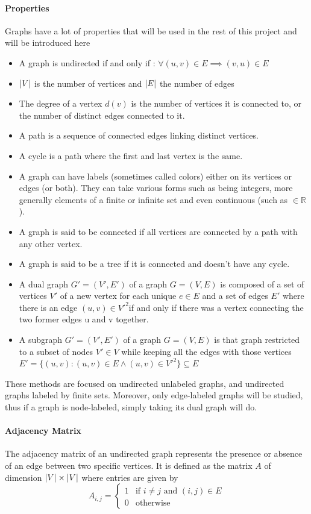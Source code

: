 \documentclass{article}
\DeclarePairedDelimiter{\abs}{\lvert}{\rvert}
\newcommand*{\R}{%
  \mathbb{R}%
}
\theoremstyle{definition}
\begin{document}
\paragraph{Properties} Graphs have a lot of properties that will be used in the rest of this project and will be introduced here
\begin{itemize}
	\item A graph is undirected if and only if : $\forall (u,v) \in E \implies (v,u)\in E$
	\item $\abs{V}$ is the number of vertices and $\abs{E}$ the number of edges
	\item The degree of a vertex $d(v)$ is the number of vertices it is connected to, or the number of distinct edges connected to it.
	\item A path is a sequence of connected edges linking distinct vertices.
	\item A cycle is a path where the first and last vertex is the same.
	\item A graph can have labels (sometimes called colors) either on its vertices or edges (or both). They can take various forms such as being integers, more generally elements of a finite or infinite set and even continuous (such as $\in \R$). 
	\item A graph is said to be connected if all vertices are connected by a path with any other vertex.
	\item A graph is said to be a tree if it is connected and doesn't have any cycle.
	\item A dual graph $G'=(V',E')$ of a graph $G=(V,E)$ is composed of a set of vertices $V'$ of a new vertex for each unique $e\in E$ and a set of edges $E'$ where there is an edge $(u,v)\in V'^2$if and only if there was a vertex connecting the two former edges u and v together.
	\item A subgraph $G'=(V',E')$ of a graph $G=(V,E)$ is that graph restricted to a subset of nodes $V' \in V$ while keeping all the edges with those vertices $E' = \{(u,v) : (u,v) \in E \land (u,v) \in V'^{2}\} \subseteq E$
\end{itemize} These methods are focused on undirected unlabeled graphs, and undirected graphs labeled by finite sets. Moreover, only edge-labeled graphs will be studied, thus if a graph is node-labeled, simply taking its dual graph will do.
\paragraph{Adjacency Matrix} The adjacency matrix of an undirected graph represents the presence or absence of an edge between two specific vertices. It is defined as the matrix $A$ of dimension $\abs{V}\times\abs{V}$ where entries are given by
\begin{equation}
	A_{i,j}=\left\{
	\begin{matrix}
	1 & \mbox{if } i \neq j \mbox{ and } (i,j) \in E \\
	0 & \mbox{otherwise}
	\end{matrix}
	\right.
\end{equation}
\end{document}
